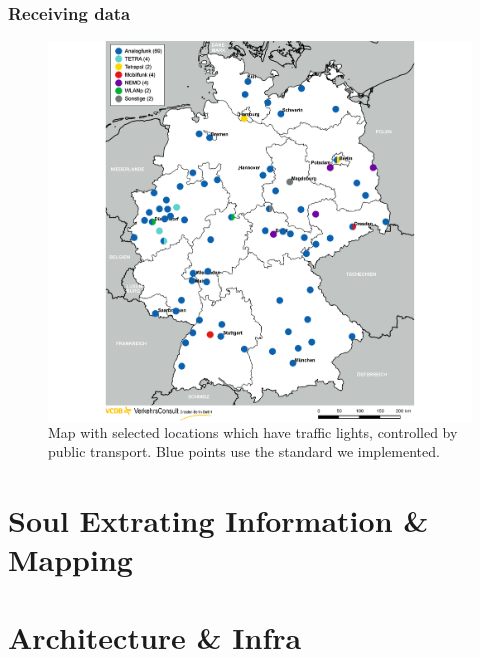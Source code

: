 \documentclass[aspectratio=169]{beamer}
\begin{document}
\begin{frame}
\frametitle{Receiving data}
\begin{figure}
\centering
\begin{columns}
\includegraphics[height=0.8\textheight]{figs/vcdb-map-ampelbeeinflussung.png}
\caption{Map with selected locations which have traffic lights, controlled by public transport. Blue points use the standard we implemented.}
\end{columns}
\end{figure}
\end{frame}


\section{Soul Extrating Information \& Mapping }




\section{Architecture \& Infra }
\end{document}

